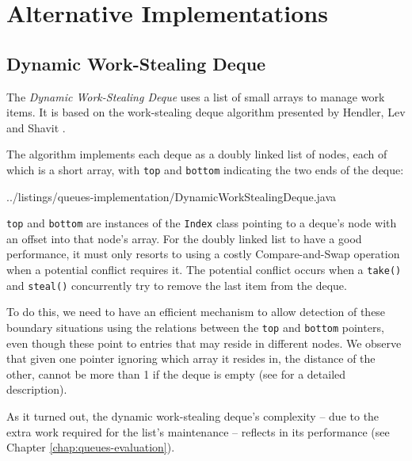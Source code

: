 


\section{Alternative Implementations}
\label{sec:queues-alternative-implementations}

\subsection{Dynamic Work-Stealing Deque}
\label{sec:queues-alternative-implementations-dynamic-deque}

The \emph{Dynamic Work-Stealing Deque} uses a list of small arrays to
manage work items. It is based on the work-stealing deque algorithm
presented by Hendler, Lev and Shavit \cite{Hendler2006, Hendler2006a}.

The algorithm implements each deque as a doubly linked list of nodes,
each of which is a short array, with \lstinline!top! and
\lstinline!bottom! indicating the two ends of the deque:


{
    ../listings/queues-implementation/DynamicWorkStealingDeque.java
}

\lstinline!top! and \lstinline!bottom! are instances of the
\lstinline!Index! class pointing to a deque's node with an offset into
that node's array. For the doubly linked list to have a good
performance, it must only resorts to using a costly Compare-and-Swap
operation when a potential conflict requires it. The potential
conflict occurs when a \lstinline!take()!  and \lstinline!steal()!
concurrently try to remove the last item from the deque.

To do this, we need to have an efficient mechanism to allow detection
of these boundary situations using the relations between the
\lstinline!top! and \lstinline!bottom! pointers, even though these
point to entries that may reside in different nodes. We observe that
given one pointer ignoring which array it resides in, the distance of
the other, cannot be more than 1 if the deque is empty (see
\cite{Hendler2006, Hendler2006a} for a detailed description).

As it turned out, the dynamic work-stealing deque's complexity -- due
to the extra work required for the list's maintenance -- reflects in
its performance (see Chapter \ref{chap:queues-evaluation}).


